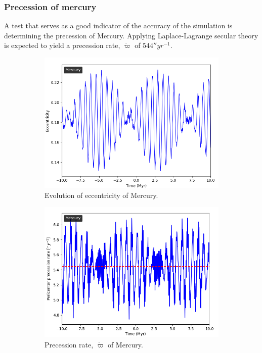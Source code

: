 \documentclass[11pt, oneside]{article}   	%
\begin{document}
\subsubsection{Precession of mercury}

A test that serves as a good indicator of the accuracy of the simulation is determining the precession of Mercury. Applying Laplace-Lagrange secular theory is expected to yield a precession rate, $\dot{\varpi}$ of $544{}'' yr^{-1}$\cite{PRMer}.
        
\begin{figure}[!h]
    \centering
    \begin{subfigure}[t]{0.49\textwidth}
    \captionsetup{width=0.9\textwidth}
	\centering
       	 \includegraphics[width=\textwidth]{Merc_ecc.png}
       	 \caption{Evolution of eccentricity of Mercury.}
        	\label{}
    \end{subfigure}
    \begin{subfigure}[t]{0.49\textwidth}
    \captionsetup{width=0.9\textwidth}
        	\centering
	\includegraphics[width=\textwidth]{Merc_pidot.png}
        	\caption{Precession rate, $\dot{\varpi}$ of Mercury.}
        	\label{}
    \end{subfigure}
    \caption{}
    \label{}
\end{figure}
\end{document}

